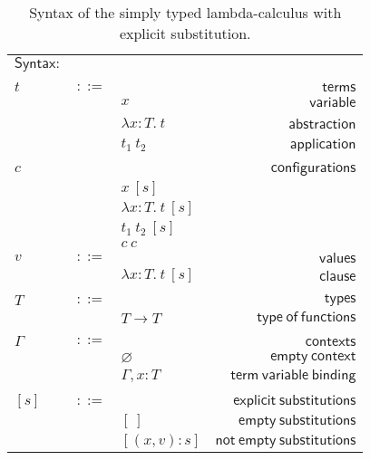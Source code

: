 \documentclass {article}
\newcommand{\app}[2]{#1 \ #2}
\newcommand{\abs}[3]{\lambda #1:#2. \ #3}
\newcommand{\conf}[2][s]{#2 \ [#1]}
\newcommand{\subxD}{[(x,v):s]}
\begin{document}
\begin{table}
\begin{center}
\begin{tabular}{|l c l r|}
\hline
$\mathsf {Syntax}:$&&&\\
&&&\\
$t$&$::=$&&$\mathsf {terms}$\\
&&$x$&$\mathsf {variable}$\\
&&$\abs {x}{T}{t}$&\ $\mathsf {abstraction}$\\
&&$\app {t_1}{t_2}$&$\mathsf {application}$\\
&&&\\
$c$&&&$\mathsf {configurations}$\\
&&$\conf {x}$&\\
&&$\conf {\abs {x}{T}{t}}$&\\
&&$\conf {\app {t_1}{t_2}}$&\\
&&$c \ c $&\\
$v$&$::=$&&$\mathsf {values}$\\
&&$\conf {\abs {x}{T}{t}}$&$\mathsf {clause }$\\
&&&\\
$T$&$::=$&&$\mathsf {types}$\\
&&$T \to T$&$\mathsf {type \ of \ functions}$\\
&&&\\
$\Gamma$&$::=$&&$\mathsf {contexts}$\\
&&$\varnothing$&$\mathsf {empty \ context}$\\
&&$\Gamma , x:T$&$\mathsf {term \ variable \ binding}$\\
&&&\\
$[s]$&$::=$&&$\mathsf {explicit \ substitutions}$\\
&&$[ \ ]$&$\mathsf {empty \ substitutions}$\\
&&$\subxD$&$\mathsf {not \ empty \ substitutions}$\\
\hline
\end{tabular}
\caption{Syntax of the simply typed lambda-calculus with explicit substitution.}
\label{tabla:sencilla}
\end{center}
\end{table}
\end{document}
